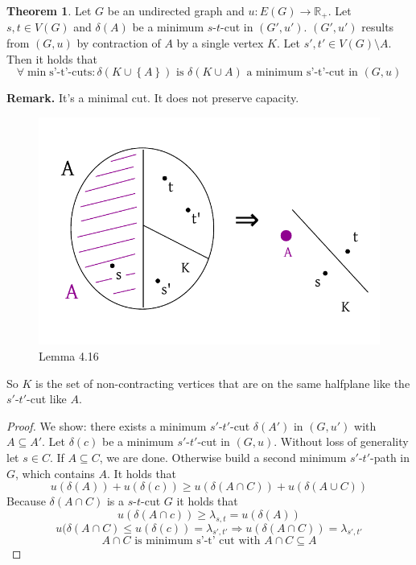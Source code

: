 \documentclass[a4paper]{article}
\theoremstyle{definition}
\newtheorem{theorem}{Theorem}
\newcommand{\set}[1]{\left\{#1\right\}}
\begin{document}
\begin{theorem}\label{lemma-4.16}
  Let $G$ be an undirected graph and $u: E(G) \rightarrow \mathbb{R}_+$.
  Let $s, t \in V(G)$ and $\delta(A)$ be a minimum $s$-$t$-cut in $(G', u')$.
  $(G', u')$ results from $(G, u)$ by contraction of $A$ by a single vertex $K$.
  Let $s', t' \in V(G) \setminus A$. Then it holds that
  \[
    \forall \min{\text{s'-t'-cuts}}: \delta(K \cup \set{A}) \text{ is }
      \delta(K \cup A) \text{ a minimum s'-t'-cut in } (G, u)
  \]
\end{theorem}

\textbf{Remark.}
  It's a minimal cut. It does not preserve capacity.

\begin{figure}[ht]
 \begin{center}
  \includegraphics{img/lemma_4_16.pdf}
  \caption{Lemma 4.16}
 \end{center}
\end{figure}

So $K$ is the set of non-contracting vertices that are on the same halfplane like the $s'$-$t'$-cut like $A$.

\begin{proof}
  We show: there exists a minimum $s'$-$t'$-cut $\delta(A')$ in $(G, u')$ with $A \subseteq A'$.
  Let $\delta(c)$ be a minimum $s'$-$t'$-cut in $(G, u)$. Without loss of generality let $s \in C$.
  If $A \subseteq C$, we are done. Otherwise build a second minimum $s'$-$t'$-path in $G$, which contains $A$.
  It holds that
  \[
    u(\delta(A)) + u(\delta(c)) \geq u(\delta(A \cap C)) + u(\delta(A \cup C))
  \]
  Because $\delta(A \cap C)$ is a $s$-$t$-cut $G$ it holds that
  \[
    u(\delta(A \cap c)) \geq \lambda_{s,t} = u(\delta(A))
  \] \[
    u(\delta(A \cap C) \leq u(\delta(c)) = \lambda_{s',t'} \Rightarrow u(\delta(A \cap C)) = \lambda_{s',t'}
  \] \[
    A \cap C \text{ is minimum s'-t' cut with } A \cap C \subseteq A
  \]
\end{proof}
\end{document}
